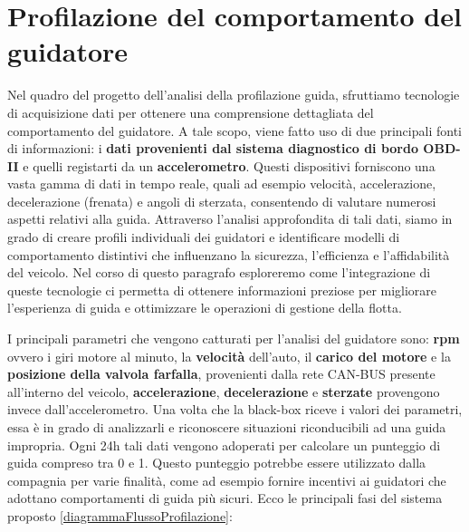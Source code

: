 \documentclass[12pt, a4paper, italian]{report}
\numberwithin{figure}{chapter}
\numberwithin{table}{chapter}
\begin{document}
\section{Profilazione del comportamento del guidatore}
\label{sec:AnalisiProfilazione}
Nel quadro del progetto dell'analisi della profilazione guida, sfruttiamo tecnologie di acquisizione dati per ottenere una comprensione dettagliata del comportamento del guidatore. A tale scopo, viene fatto uso di due principali fonti di informazioni: i \textbf{dati provenienti dal sistema diagnostico di bordo OBD-II} e quelli registarti da un \textbf{accelerometro}. Questi dispositivi forniscono una vasta gamma di dati in tempo reale, quali ad esempio velocità, accelerazione, decelerazione (frenata) e angoli di sterzata, consentendo di valutare numerosi aspetti relativi alla guida. Attraverso l'analisi approfondita di tali dati, siamo in grado di creare profili individuali dei guidatori e identificare modelli di comportamento distintivi che influenzano la sicurezza, l'efficienza e l'affidabilità del veicolo. Nel corso di questo paragrafo esploreremo come l'integrazione di queste tecnologie ci permetta di ottenere informazioni preziose per migliorare l'esperienza di guida e ottimizzare le operazioni di gestione della flotta.

\vspace{1cm} 

I principali parametri che vengono catturati per l'analisi del guidatore sono: \textbf{rpm} ovvero i giri motore al minuto, la \textbf{velocità} dell'auto, il \textbf{carico del motore} e la \textbf{posizione della valvola farfalla}, provenienti dalla rete CAN-BUS presente all'interno del veicolo, \textbf{accelerazione}, \textbf{decelerazione} e \textbf{sterzate} provengono invece dall'accelerometro. Una volta che la black-box riceve i valori dei parametri, essa è in grado di analizzarli e riconoscere situazioni riconducibili ad una guida impropria. Ogni 24h tali dati vengono adoperati per calcolare un punteggio di guida compreso tra 0 e 1. Questo punteggio potrebbe essere utilizzato dalla compagnia per varie finalità, come ad esempio fornire incentivi ai guidatori che adottano comportamenti di guida più sicuri. Ecco le principali fasi del sistema proposto \ref{diagrammaFlussoProfilazione}:

\vspace{1.2cm}
\end{document}
